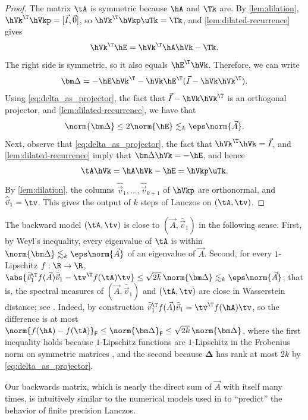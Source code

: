 \begin{proof}
The matrix \(\tA\) is symmetric because \(\hA\) and \(\Tk\) are.
By \cref{lem:dilation}, \(\hVk^\T\hVkp=[\vec I,\vec0]\), so \(\hVk^\T\hVkp\uTk=\Tk\), and \cref{lem:dilated-recurrence} gives
\[
 \hVk^\T\hE=\hVk^\T\hA\hVk-\Tk.
\]
The right side is symmetric, so it also equals \(\hE^\T\hVk\).
Therefore, we can write 
\begin{equation}
  \label{eq:delta_as_projector}
   \bm\Delta=-\hE\hVk^\T-\hVk\hE^\T(\vec I-\hVk\hVk^\T).
\end{equation}
Using \cref{eq:delta_as_projector}, the fact that $\vec I-\hVk\hVk^\T$ is an orthogonal projector, and \cref{lem:dilated-recurrence}, we have that
\[
\norm{\bm\Delta}
\le2\norm{\hE}
\lesssim_k\eps\norm{\vec A}.
\]
Next, observe that  \cref{eq:delta_as_projector}, the fact that \(\hVk^\T\hVk=\vec I\), and \cref{lem:dilated-recurrence} imply that $\bm\Delta\hVk =-\hE$, and hence
\[
 \tA\hVk=\hA\hVk-\hE=\hVkp\uTk.
\]
By \cref{lem:dilation}, the columns \(\widehat{\vec v}_1,\ldots,\widehat{\vec v}_{k+1}\) of \(\hVkp\) are orthonormal, and \(\widehat{\vec v}_1=\tv\).
This gives the output of $k$ steps of Lanczos on $(\tA,\tv)$.
\end{proof}


\begin{remark}
\label{rem:wasserstein}
The backward model \((\tA,\tv)\) is close to \((\vec A,\bar{\vec v}_1)\) in the following sense.
First, by Weyl's inequality, every eigenvalue of \(\tA\) is within \(\norm{\bm\Delta}\lesssim_k\eps\norm{\vec A}\) of an eigenvalue of \(\vec A\).
Second, for every \(1\)-Lipschitz \(f:\R\to\R\), \(\abs{\bar{\vec v}_1^\T f(\vec A)\bar{\vec v}_1-\tv^\T f(\tA)\tv}\le \sqrt{2k}\,\norm{\bm\Delta} \lesssim_k\eps\norm{\vec A}\); that is, the spectral measures of \((\vec A,\bar{\vec v}_1)\) and \((\tA,\tv)\) are close in Wasserstein distance; see \cite{chen2024}.
Indeed, by construction \(\bar{\vec v}_1^\T f(\vec A)\bar{\vec v}_1=\tv^\T f(\hA)\tv\), so the difference is at most \(\norm{f(\hA)-f(\tA)}_{\mathsf F}\le\norm{\bm\Delta}_{\mathsf F}\le\sqrt{2k}\,\norm{\bm\Delta}\), where the first inequality holds because \(1\)-Lipschitz functions are \(1\)-Lipschitz in the Frobenius norm on symmetric matrices \cite{kittaneh1985}, and the second because \(\bm\Delta\) has rank at most \(2k\) by \cref{eq:delta_as_projector}.
\end{remark}

\begin{remark}
Our backwards matrix, which is nearly the direct sum of $\vec{A}$ with itself many times, is intuitively similar to the numerical models used in \cite{greenbaum_strakos1992,carson_liesen_strakos2024} to ``predict'' the behavior of finite precision Lanczos.  
\end{remark}

